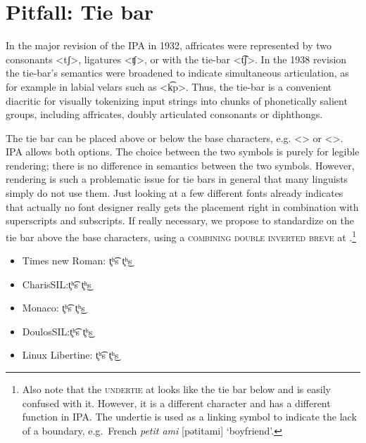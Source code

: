 

\section{Pitfall: Tie bar}
\label{pitfall-tie-bar}


In the major revision of the IPA in 1932, affricates were represented by two
consonants <tʃ>, ligatures <ʧ>, or with the tie-bar <t͡ʃ>. In the
1938 revision the tie-bar's semantics were broadened to indicate simultaneous
articulation, as for example in labial velars such as <k͡p>. Thus, the tie-bar is a
convenient diacritic for visually tokenizing input strings into chunks of
phonetically salient groups, including affricates, doubly articulated consonants
or diphthongs. 

The tie bar can be placed above or below the base characters, e.g.
<> or <>. IPA allows both options. The choice between
the two symbols is purely for legible rendering; there is no difference in
semantics between the two symbols. However, rendering is such a problematic
issue for tie bars in general that many linguists simply do not use them. Just
looking at a few different fonts already indicates that actually no font
designer really gets the placement right in combination with superscripts and
subscripts. If really necessary, we propose to standardize on the tie bar above
the base characters, using a \textsc{combining double inverted breve} at
.\footnote{Also note that the \textsc{undertie} at  looks
like the tie bar below and is easily confused with it. However, it is a
different character and has a different function in IPA. The undertie is used as
a linking symbol to indicate the lack of a boundary, e.g.\ French \textit{petit
ami} [pətitami] `boyfriend'.}

\begin{itemize}[itemsep=6pt]
  \item[] {Times new Roman: t̥ʰ͡s t̥ʰ͜s}
  \item[] {\small {}CharisSIL:\@ t̥ʰ͡s t̥ʰ͜s}
  \item[] {\footnotesize {}Monaco: t̥ʰ͡s t̥ʰ͜s}
  \item[] {DoulosSIL:\@ t̥ʰ͡s t̥ʰ͜s}
  \item[] Linux Libertine: t̥ʰ͡s t̥ʰ͜s
\end{itemize}

